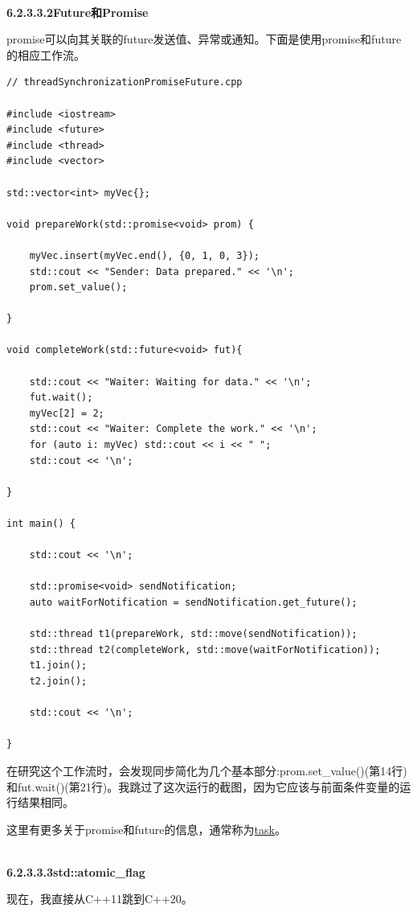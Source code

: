 \hspace*{\fill} \\ %
\noindent
\textbf{6.2.3.3.2\hspace{0.2cm}Future和Promise}

promise可以向其关联的future发送值、异常或通知。下面是使用promise和future的相应工作流。

\begin{lstlisting}[style=styleCXX]
// threadSynchronizationPromiseFuture.cpp

#include <iostream>
#include <future>
#include <thread>
#include <vector>

std::vector<int> myVec{};

void prepareWork(std::promise<void> prom) {
	
	myVec.insert(myVec.end(), {0, 1, 0, 3});
	std::cout << "Sender: Data prepared." << '\n';
	prom.set_value();

}

void completeWork(std::future<void> fut){

	std::cout << "Waiter: Waiting for data." << '\n';
	fut.wait();
	myVec[2] = 2;
	std::cout << "Waiter: Complete the work." << '\n';
	for (auto i: myVec) std::cout << i << " ";
	std::cout << '\n';

}

int main() {

	std::cout << '\n';
	
	std::promise<void> sendNotification;
	auto waitForNotification = sendNotification.get_future();
	
	std::thread t1(prepareWork, std::move(sendNotification));
	std::thread t2(completeWork, std::move(waitForNotification));
	t1.join();
	t2.join();
	
	std::cout << '\n';

}
\end{lstlisting}

在研究这个工作流时，会发现同步简化为几个基本部分:prom.set\_value()(第14行)和fut.wait()(第21行)。我跳过了这次运行的截图，因为它应该与前面条件变量的运行结果相同。

这里有更多关于promise和future的信息，通常称为\href{https://www.modernescpp.com/index.php/tag/tasks}{task}。

\hspace*{\fill} \\ %
\noindent
\textbf{6.2.3.3.3\hspace{0.2cm}std::atomic\_flag}

现在，我直接从C++11跳到C++20。

